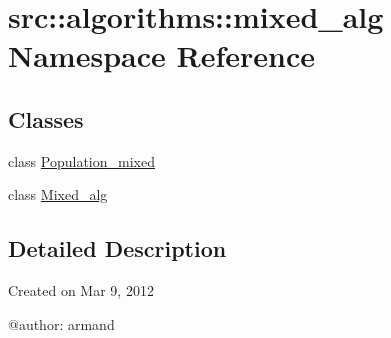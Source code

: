 \hypertarget{namespacesrc_1_1algorithms_1_1mixed__alg}{
\section{src::algorithms::mixed\_\-alg Namespace Reference}
\label{namespacesrc_1_1algorithms_1_1mixed__alg}
}
\subsection*{Classes}
\begin{DoxyCompactItemize}
\item 
class \hyperlink{classsrc_1_1algorithms_1_1mixed__alg_1_1Population__mixed}{Population\_\-mixed}
\item 
class \hyperlink{classsrc_1_1algorithms_1_1mixed__alg_1_1Mixed__alg}{Mixed\_\-alg}
\end{DoxyCompactItemize}


\subsection{Detailed Description}
\begin{DoxyVerb}
Created on Mar 9, 2012

@author: armand
\end{DoxyVerb}
 